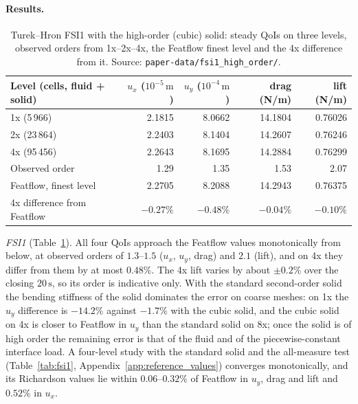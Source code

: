 \paragraph{Results.}

\begin{table}[htbp]
	\centering
	\footnotesize
	\caption{Turek--Hron FSI1 with the high-order (cubic) solid: steady QoIs on three levels, observed orders from 1x--2x--4x, the Featflow finest level and the 4x difference from it. Source: \texttt{paper-data/fsi1\_high\_order/}.}
	\label{tab:fsi1_ho}
	\begin{tabular}{lrrrr}
		\toprule
		Level (cells, fluid + solid) & $u_x$ ($10^{-5}\,\mathrm{m}$) & $u_y$ ($10^{-4}\,\mathrm{m}$) & drag (N/m) & lift (N/m) \\
		\midrule
		1x (5\,966) & 2.1815 & 8.0662 & 14.1804 & 0.76026 \\
		2x (23\,864) & 2.2403 & 8.1404 & 14.2607 & 0.76246 \\
		4x (95\,456) & 2.2643 & 8.1695 & 14.2884 & 0.76299 \\
		\midrule
		Observed order & 1.29 & 1.35 & 1.53 & 2.07 \\
		Featflow, finest level & 2.2705 & 8.2088 & 14.2943 & 0.76375 \\
		4x difference from Featflow & $-0.27\%$ & $-0.48\%$ & $-0.04\%$ & $-0.10\%$ \\
		\bottomrule
	\end{tabular}
\end{table}

\emph{FSI1} (Table~\ref{tab:fsi1_ho}).
All four QoIs approach the Featflow values monotonically from below, at observed orders of $1.3$--$1.5$ ($u_x$, $u_y$, drag) and $2.1$ (lift), and on 4x they differ from them by at most $0.48\%$. The 4x lift varies by about $\pm0.2\%$ over the closing $20\,\mathrm{s}$, so its order is indicative only.
With the standard second-order solid the bending stiffness of the solid dominates the error on coarse meshes: on 1x the $u_y$ difference is $-14.2\%$ against $-1.7\%$ with the cubic solid, and the cubic solid on 4x is closer to Featflow in $u_y$ than the standard solid on 8x; once the solid is of high order the remaining error is that of the fluid and of the piecewise-constant interface load.
A four-level study with the standard solid and the all-measure test (Table~\ref{tab:fsi1}, Appendix~\ref{app:reference_values}) converges monotonically, and its Richardson values lie within $0.06$--$0.32\%$ of Featflow in $u_y$, drag and lift and $0.52\%$ in $u_x$.

